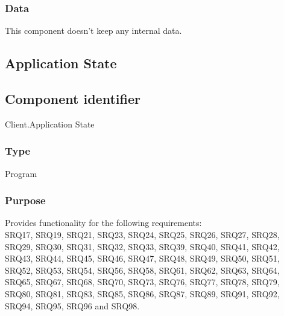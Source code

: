 \subsubsection*{Data}
This component doesn't keep any internal data.

\subsection{Application State}
\label{subsec:Appservice}

\subsection*{Component identifier}
Client.Application State

\subsubsection*{Type}
Program

\subsubsection*{Purpose}
Provides functionality for the following requirements: \\
 SRQ17, SRQ19, SRQ21, SRQ23, SRQ24, SRQ25, SRQ26, SRQ27, SRQ28, SRQ29, SRQ30, SRQ31, SRQ32, SRQ33, SRQ39, SRQ40, SRQ41, SRQ42, SRQ43, SRQ44, SRQ45, SRQ46, SRQ47, SRQ48, SRQ49, SRQ50, SRQ51, SRQ52, SRQ53, SRQ54, SRQ56, SRQ58, SRQ61, SRQ62, SRQ63, SRQ64, SRQ65, SRQ67, SRQ68, SRQ70, SRQ73, SRQ76, SRQ77, SRQ78, SRQ79, SRQ80, SRQ81, SRQ83, SRQ85, SRQ86, SRQ87, SRQ89, SRQ91, SRQ92, SRQ94, SRQ95, SRQ96 and SRQ98.\\


